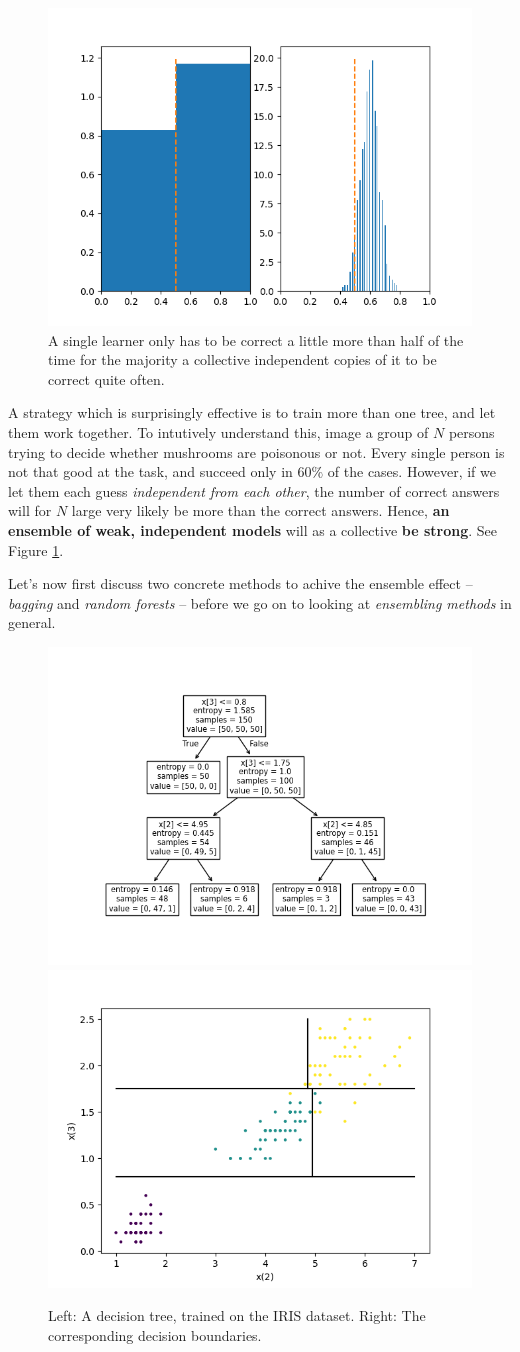 \documentclass{article}
\begin{document}
\begin{figure}
    \centering
    \includegraphics[width=0.6\linewidth]{graphics/ensemble_example.png}
\caption{A single learner only has to be correct a little more than half of the time for the majority a collective independent copies of it to be correct quite often.}
\label{fig:ensemble}
\end{figure}

A strategy which is surprisingly effective is to train more than one tree, and let them work together. To intutively understand this, image a group of $N$ persons trying to decide whether mushrooms are poisonous or not. Every single person is not that good at the task, and succeed only in $60\%$ of the cases. However, if we let them each guess \emph{independent from each other}, the number of correct answers will for $N$ large very likely be more than the correct answers. Hence, \textbf{an ensemble of weak, independent models} will as a collective \textbf{be strong}. See Figure \ref{fig:ensemble}.



Let's now  first discuss two concrete methods to achive the ensemble effect --\emph{bagging} and \emph{random forests} --  before we go on to looking at \emph{ensembling methods} in general.










\begin{figure}
    \centering
    \includegraphics[width=0.35\linewidth]{graphics/trained_tree.png}\includegraphics[width=0.35\linewidth]{graphics/decision_surfaces.png}
    \caption{Left: A decision tree, trained on the IRIS dataset. Right: The corresponding decision boundaries.}
    \label{fig:enter-label}
\end{figure}
\end{document}
